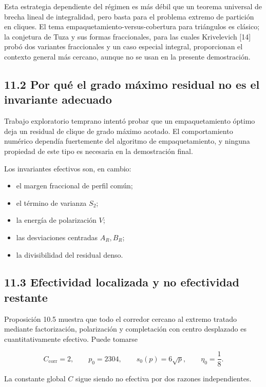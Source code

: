 \documentclass[
  11pt,
]{article}
\providecommand{\tightlist}{%
  \setlength{\itemsep}{0pt}\setlength{\parskip}{0pt}}
\begin{document}
Esta estrategia dependiente del régimen es más débil que un teorema
universal de brecha lineal de integralidad, pero basta para el problema
extremo de partición en cliques. El tema
empaquetamiento-versus-cobertura para triángulos es clásico; la
conjetura de Tuza y sus formas fraccionales, para las cuales Krivelevich
{[}14{]} probó dos variantes fraccionales y un caso especial integral,
proporcionan el contexto general más cercano, aunque no se usan en la
presente demostración.

\subsection{11.2 Por qué el grado máximo residual no es el invariante
adecuado}\label{por-quuxe9-el-grado-muxe1ximo-residual-no-es-el-invariante-adecuado}

Trabajo exploratorio temprano intentó probar que un empaquetamiento
óptimo deja un residual de clique de grado máximo acotado. El
comportamiento numérico dependía fuertemente del algoritmo de
empaquetamiento, y ninguna propiedad de este tipo es necesaria en la
demostración final.

Los invariantes efectivos son, en cambio:

\begin{itemize}
\tightlist
\item
  el margen fraccional de perfil común;
\item
  el término de varianza \(S_2\);
\item
  la energía de polarización \(V\);
\item
  las desviaciones centradas \(A_R,B_R\);
\item
  la divisibilidad del residual denso.
\end{itemize}

\subsection{11.3 Efectividad localizada y no efectividad
restante}\label{efectividad-localizada-y-no-efectividad-restante}

Proposición 10.5 muestra que todo el corredor cercano al extremo tratado
mediante factorización, polarización y completación con centro
desplazado es cuantitativamente efectivo. Puede tomarse

\[
C_{\mathrm{corr}}=2,
\qquad
p_0=2304,
\qquad
s_0(p)=6\sqrt p,
\qquad
\eta_0=\frac18.
\]

La constante global \(C\) sigue siendo no efectiva por dos razones
independientes.
\end{document}
